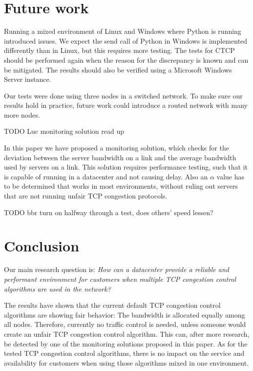 \documentclass{article}
\begin{document}
\section{Future work}\label{sec:futurework}

Running a mixed environment of Linux and Windows where Python is running
introduced issues. We expect the send call of Python in Windows is implemented
differently than in Linux, but this requires more testing. The tests for CTCP
should be performed again when the reason for the discrepancy is known and can
be mitigated. The results should also be verified using a Microsoft Windows
Server instance.

Our tests were done using three nodes in a switched network. To make sure our
results hold in practice, future work could introduce a routed network with
many more nodes.

TODO Luc monitoring solution read up

In this paper we have proposed a monitoring solution, which checks for the deviation between the server bandwidth on a link and the average bandwidth used by servers on a link. This solution requires performance testing, such that it is capable of running in a datacenter and not causing delay. Also an $\alpha$ value has to be determined that works in most environments, without ruling out servers that are not running unfair TCP congestion protocols.

TODO bbr turn on halfway through a test, does others' speed lessen?

\section{Conclusion}\label{sec:conclusion}

Our main research question is: {\it How can a datacenter provide a reliable and performant environment for customers when multiple TCP congestion control algorithms are used in the network?} 

The results have shown that the current default TCP congestion control algorithms are showing fair behavior: The bandwidth is allocated equally among all nodes. Therefore, currently no traffic control is needed, unless someone would create an unfair TCP congestion control algorithm. This can, after more research, be detected by one of the monitoring solutions proposed in this paper. As for the tested TCP congestion control algorithms, there is no impact on the service and availability for customers when using those algorithms mixed in one environment.
\end{document}
